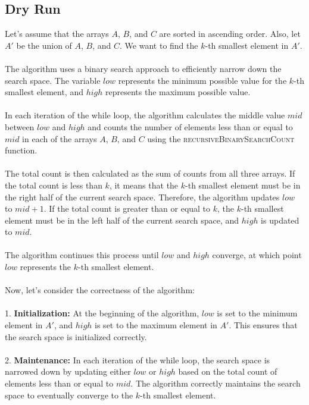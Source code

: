 \documentclass{article}
\begin{document}
\subsection{Dry Run}
Let's assume that the arrays $A$, $B$, and $C$ are sorted in ascending order. Also, let $A'$ be the union of $A$, $B$, and $C$. We want to find the $k$-th smallest element in $A'$.
\\\\
The algorithm uses a binary search approach to efficiently narrow down the search space. The variable $low$ represents the minimum possible value for the $k$-th smallest element, and $high$ represents the maximum possible value.
\\\\
In each iteration of the while loop, the algorithm calculates the middle value $mid$ between $low$ and $high$ and counts the number of elements less than or equal to $mid$ in each of the arrays $A$, $B$, and $C$ using the \textsc{recursiveBinarySearchCount} function.
\\\\
The total count is then calculated as the sum of counts from all three arrays. If the total count is less than $k$, it means that the $k$-th smallest element must be in the right half of the current search space. Therefore, the algorithm updates $low$ to $mid + 1$. If the total count is greater than or equal to $k$, the $k$-th smallest element must be in the left half of the current search space, and $high$ is updated to $mid$.
\\\\
The algorithm continues this process until $low$ and $high$ converge, at which point $low$ represents the $k$-th smallest element.
\\\\
Now, let's consider the correctness of the algorithm:
\\\\
1. \textbf{Initialization:}
   At the beginning of the algorithm, $low$ is set to the minimum element in $A'$, and $high$ is set to the maximum element in $A'$. This ensures that the search space is initialized correctly.
\\\\
2. \textbf{Maintenance:}
   In each iteration of the while loop, the search space is narrowed down by updating either $low$ or $high$ based on the total count of elements less than or equal to $mid$. The algorithm correctly maintains the search space to eventually converge to the $k$-th smallest element.
\\\\
\end{document}
